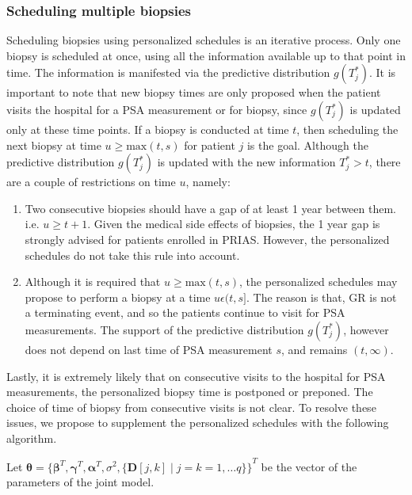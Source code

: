 \subsubsection{Scheduling multiple biopsies}
\label{subsubsec : pers_sched_algorithm}
Scheduling biopsies using personalized schedules is an iterative process. Only one biopsy is scheduled at once, using all the information available up to that point in time. The information is manifested via the predictive distribution $g(T^*_j)$. It is important to note that new biopsy times are only proposed when the patient visits the hospital for a PSA measurement or for biopsy, since $g(T^*_j)$ is updated only at these time points. If a biopsy is conducted at time $t$, then scheduling the next biopsy at time $u \geq \text{max}(t,s)$ for patient $j$ is the goal. Although the predictive distribution $g(T^*_j)$ is updated with the new information $T^*_j > t$, there are a couple of restrictions on time $u$, namely:

\begin{enumerate}
\item Two consecutive biopsies should have a gap of at least 1 year between them. i.e. $u \geq t + 1$. Given the medical side effects of biopsies, the 1 year gap is strongly advised for patients enrolled in PRIAS. However, the personalized schedules do not take this rule into account.
\item Although it is required that $u \geq \text{max}(t,s)$, the personalized schedules may propose to perform a biopsy at a time $u \epsilon (t, s]$. The reason is that, GR is not a terminating event, and so the patients continue to visit for PSA measurements. The support of the predictive distribution $g(T^*_j)$, however does not depend on last time of PSA measurement $s$, and remains $(t, \infty)$.
\end{enumerate}
 
Lastly, it is extremely likely that on consecutive visits to the hospital for PSA measurements, the personalized biopsy time is postponed or preponed. The choice of time of biopsy from consecutive visits is not clear. To resolve these issues, we propose to supplement the personalized schedules with the following algorithm.


Let $\boldsymbol{\theta} = {\{\boldsymbol{\beta}^T, \boldsymbol{\gamma}^T, \boldsymbol{\alpha}^T, \sigma^2, \{\boldsymbol{D}[j,k] \mid j=k=1, \ldots q\}\}}^T$ be the vector of the parameters of the joint model.
